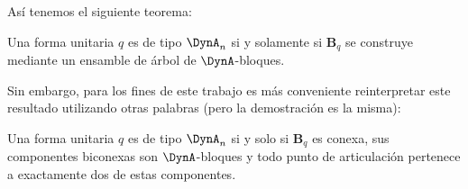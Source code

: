 Así tenemos el siguiente teorema:\\

\begin{theorem}
Una forma unitaria $q$ es de tipo $\DynA_{n}$ si y solamente si $\textbf{B}_{q}$ se construye mediante un ensamble de árbol de $\DynA$-bloques.
\label{teorema:2.12}
\end{theorem}

Sin embargo, para los fines de este trabajo es más conveniente reinterpretar este resultado utilizando otras palabras (pero la demostración es la misma):

\begin{corollary}
Una forma unitaria $q$ es de tipo $\DynA_{n}$ si y solo si $\textbf{B}_{q}$ es conexa, sus componentes biconexas son $\DynA$-bloques y todo punto de articulación pertenece a exactamente dos de estas componentes.
\label{corolario:2.13}
\end{corollary}
